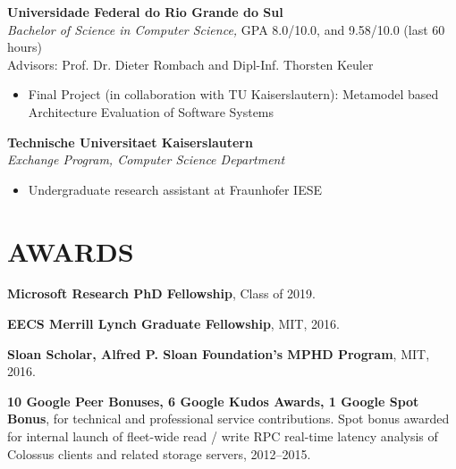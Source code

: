 \documentclass[line,margin]{res}
\begin{document}
\begin{resume}
  \textbf{Universidade Federal do Rio Grande do Sul} \\ %
  {\sl Bachelor of Science in Computer Science,} GPA 8.0/10.0, and 9.58/10.0 (last 60 hours) \\
  Advisors: Prof. Dr. Dieter Rombach and Dipl-Inf. Thorsten Keuler
  \begin{itemize}  \itemsep -2pt
  \item  Final Project (in collaboration with TU Kaiserslautern): Metamodel based Architecture Evaluation of Software Systems
  \end{itemize}

  \textbf{Technische Universitaet Kaiserslautern} \\ %
  {\sl Exchange Program, Computer Science Department}
  \begin{itemize}  \itemsep -2pt
  \item  Undergraduate research assistant at Fraunhofer IESE
  \end{itemize}

%

\section{AWARDS}

\textbf{Microsoft Research PhD Fellowship}, Class of 2019.

\textbf{EECS Merrill Lynch Graduate Fellowship}, MIT, 2016.


\textbf{Sloan Scholar, Alfred P. Sloan Foundation's MPHD Program}, MIT, 2016.

\textbf{10 Google Peer Bonuses, 6 Google Kudos Awards, 1 Google Spot Bonus}, for technical and professional service contributions.  Spot bonus awarded for internal launch of fleet-wide read / write RPC real-time latency analysis of Colossus clients and related storage servers, 2012--2015.


\end{resume}
\end{document}
